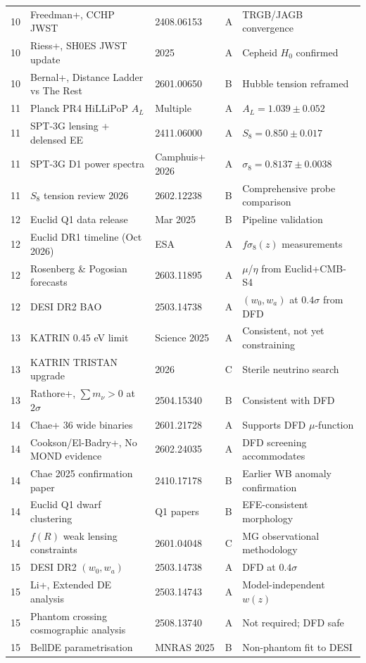 \documentclass[11pt,a4paper]{article}
\begin{document}
\begin{longtable}{p{0.5cm}p{5cm}p{3cm}p{1cm}p{4cm}}
10 & Freedman+, CCHP JWST & 2408.06153 & A & TRGB/JAGB convergence \\
10 & Riess+, SH0ES JWST update & 2025 & A & Cepheid $H_0$ confirmed \\
10 & Bernal+, Distance Ladder vs The Rest & 2601.00650 & B & Hubble tension reframed \\
\midrule
11 & Planck PR4 HiLLiPoP $A_L$ & Multiple & A & $A_L = 1.039 \pm 0.052$ \\
11 & SPT-3G lensing + delensed EE & 2411.06000 & A & $S_8 = 0.850 \pm 0.017$ \\
11 & SPT-3G D1 power spectra & Camphuis+ 2026 & A & $\sigma_8 = 0.8137 \pm 0.0038$ \\
11 & $S_8$ tension review 2026 & 2602.12238 & B & Comprehensive probe comparison \\
\midrule
12 & Euclid Q1 data release & Mar 2025 & B & Pipeline validation \\
12 & Euclid DR1 timeline (Oct 2026) & ESA & A & $f\sigma_8(z)$ measurements \\
12 & Rosenberg \& Pogosian forecasts & 2603.11895 & A & $\mu$/$\eta$ from Euclid+CMB-S4 \\
12 & DESI DR2 BAO & 2503.14738 & A & $(w_0,w_a)$ at $0.4\sigma$ from DFD \\
\midrule
13 & KATRIN 0.45 eV limit & Science 2025 & A & Consistent, not yet constraining \\
13 & KATRIN TRISTAN upgrade & 2026 & C & Sterile neutrino search \\
13 & Rathore+, $\sum m_\nu > 0$ at $2\sigma$ & 2504.15340 & B & Consistent with DFD \\
\midrule
14 & Chae+ 36 wide binaries & 2601.21728 & A & Supports DFD $\mu$-function \\
14 & Cookson/El-Badry+, No MOND evidence & 2602.24035 & A & DFD screening accommodates \\
14 & Chae 2025 confirmation paper & 2410.17178 & B & Earlier WB anomaly confirmation \\
14 & Euclid Q1 dwarf clustering & Q1 papers & B & EFE-consistent morphology \\
14 & $f(R)$ weak lensing constraints & 2601.04048 & C & MG observational methodology \\
\midrule
15 & DESI DR2 $(w_0,w_a)$ & 2503.14738 & A & DFD at $0.4\sigma$ \\
15 & Li+, Extended DE analysis & 2503.14743 & A & Model-independent $w(z)$ \\
15 & Phantom crossing cosmographic analysis & 2508.13740 & A & Not required; DFD safe \\
15 & BellDE parametrisation & MNRAS 2025 & B & Non-phantom fit to DESI \\
\bottomrule
\end{longtable}
\end{document}
